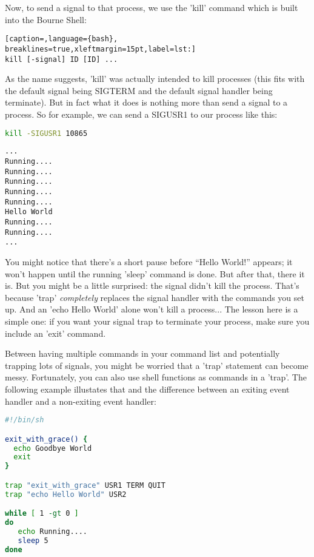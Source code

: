 Now, to send a signal to that process, we use the 'kill' command which is built
into the Bourne Shell: 
\lstset{basicstyle=\scriptsize, numbers=left, captionpos=b, tabsize=4}
\begin{lstlisting}[caption=,language={bash},
breaklines=true,xleftmargin=15pt,label=lst:]
kill [-signal] ID [ID] ...
\end{lstlisting}

As the name suggests, 'kill' was actually intended to kill processes (this fits
with the default signal being SIGTERM and the default signal handler being
terminate). But in fact what it does is nothing more than send a signal to a
process. So for example, we can send a SIGUSR1 to our process like this:
\lstset{basicstyle=\scriptsize, numbers=left, captionpos=b, tabsize=4}
\begin{lstlisting}[caption=Let's trip the trap...,language={bash},
breaklines=true,xleftmargin=15pt,label=lst:Let's trip the trap...]
kill -SIGUSR1 10865
\end{lstlisting}

\scriptsize
\begin{verbatim}
...
Running....
Running....
Running....
Running....
Running....
Hello World
Running....
Running....
...
\end{verbatim}
\normalsize

You might notice that there's a short pause before ``Hello World!'' appears; it
won't happen until the running 'sleep' command is done. But after that, there
it is. But you might be a little surprised: the signal didn't kill the process.
That's because 'trap' \emph{completely} replaces the signal handler with the
commands you set up. And an 'echo Hello World' alone won't kill a process...
The lesson here is a simple one: if you want your signal trap to terminate your
process, make sure you include an 'exit' command.

Between having multiple commands in your command list and potentially trapping
lots of signals, you might be worried that a 'trap' statement can become messy.
Fortunately, you can also use shell functions as commands in a 'trap'. The
following example illustates that and the difference between an exiting event
handler and a non-exiting event handler:

\lstset{basicstyle=\scriptsize, numbers=left, captionpos=b, tabsize=4}
\begin{lstlisting}[caption=A trap with a shell function as a handler,language={bash},
breaklines=true,xleftmargin=15pt,label=lst:A trap with a shell function as a handler]
#!/bin/sh

exit_with_grace() {
  echo Goodbye World
  exit
}

trap "exit_with_grace" USR1 TERM QUIT
trap "echo Hello World" USR2

while [ 1 -gt 0 ]
do
   echo Running....
   sleep 5
done
\end{lstlisting}

